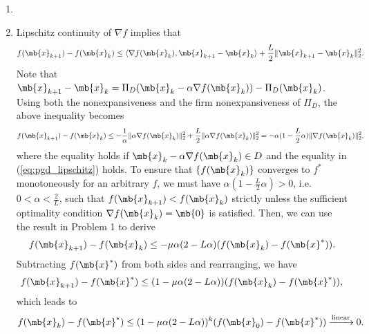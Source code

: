 \begin{exercise}
\begin{enumerate}
            \begin{solution}
                \begin{enumerate}
                    \item []
                    \item Lipschitz continuity of $\nabla f$ implies that
                        \begin{align}\label{eq:pgd_lipschitz}
                            f(\mb{x}_{k+1}) - f(\mb{x}_k) \le \langle \nabla f(\mb{x}_k), \mb{x}_{k+1} - \mb{x}_k \rangle + \frac{L}{2}\|\mb{x}_{k+1} - \mb{x}_k\|_2^2.
                        \end{align}
                        Note that $\mb{x}_{k+1} - \mb{x}_k = \Pi_{D}(\mb{x}_k-\alpha\nabla f(\mb{x}_k)) - \Pi_{D}(\mb{x}_k)$. Using both the nonexpansiveness and the firm nonexpansiveness of $\Pi_D$, the above inequality becomes
                        \begin{align*}
                            f(\mb{x}_{k+1}) - f(\mb{x}_k) \le -\frac{1}{\alpha} \|\alpha\nabla f(\mb{x}_k)\|_2^2 + \frac{L}{2}\|\alpha\nabla f(\mb{x}_k)\|_2^2 = -\alpha(1-\frac{L}{2}\alpha)\|\nabla f(\mb{x}_k)\|_2^2,
                        \end{align*}
                        where the equality holds if $\mb{x}_k-\alpha\nabla f(\mb{x}_k) \in D$ and the equality in  (\ref{eq:pgd_lipschitz}) holds.
                        To ensure that $\{f(\mb{x}_k)\}$ converges to $f^*$ monotoneously for an arbitrary $f$, we must have $\alpha(1-\frac{L}{2}\alpha) > 0$, i.e. $0 < \alpha < \frac{2}{L}$, such that $f(\mb{x}_{k+1}) < f(\mb{x}_k)$ strictly unless the sufficient optimality condition $\nabla f(\mb{x}_k) = \mb{0}$ is satisfied. Then, we can use the result in Problem 1 to derive
                        \begin{align*}
                            f(\mb{x}_{k+1}) - f(\mb{x}_k) \le -\mu\alpha(2-L\alpha)(f(\mb{x}_k) - f(\mb{x}^*)).
                        \end{align*}
                        Subtracting $f(\mb{x}^*)$ from both sides and rearranging, we have
                        \begin{align*}
                            f(\mb{x}_{k+1}) - f(\mb{x}^*) \le (1 -\mu\alpha(2-L\alpha))(f(\mb{x}_k) - f(\mb{x}^*)),
                        \end{align*}
                        which leads to
                        \begin{align*}
                            f(\mb{x}_k) - f(\mb{x}^*) \le (1 -\mu\alpha(2-L\alpha))^k (f(\mb{x}_0) - f(\mb{x}^*))  \xrightarrow[]{\textup{linear}} 0.

\end{align*}
\end{enumerate}
\end{solution}
\end{enumerate}
\end{exercise}
